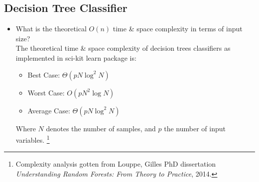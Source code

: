 \documentclass[twoside,openright,titlepage,numbers=noenddot,headinclude,%
               footinclude=true,cleardoublepage=empty,abstractoff,BCOR=5mm,%
               paper=a4,fontsize=11pt,ngerman,american]{scrreprt}
\numberwithin{theorem}{chapter}
\numberwithin{definition}{chapter}
\numberwithin{algorithm}{chapter}
\numberwithin{figure}{chapter}
\numberwithin{table}{chapter}
\numberwithin{equation}{chapter}
\begin{document}
\subsection*{Decision Tree Classifier}
\begin{itemize} 
\item What is the theoretical $O(n)$ time \& space complexity in terms of input size?\\ 
The theoretical time \& space complexity of decision trees classifiers as implemented in sci-kit learn package is:
\begin{itemize} 
\item Best Case: $\Theta(pN\log^2 N)$ 
\item Worst Case: $O(pN^2\log N)$
\item Average Case: $\Theta(pN\log^2 N)$
\end{itemize}
Where $N$ denotes the number of samples, and $p$ the number of input variables. \footnote{Complexity analysis gotten from Louppe, Gilles PhD dissertation \textit{Understanding Random Forests: From Theory to Practice}, 2014.}


\end{itemize}
\end{document}

